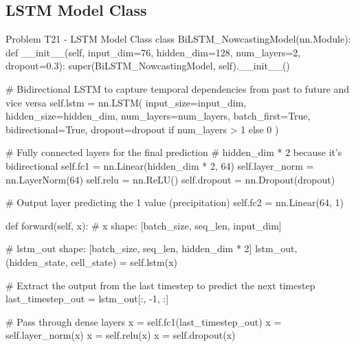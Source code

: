 \documentclass[12pt, a4paper]{article}
\begin{document}
            \subsection{LSTM Model Class}
                \begin{codeblock}{Problem T21 - LSTM Model Class}
                    class BiLSTM_NowcastingModel(nn.Module):
                        def __init__(self, input_dim=76, hidden_dim=128, num_layers=2, dropout=0.3):
                            super(BiLSTM_NowcastingModel, self).__init__()
                            
                            # Bidirectional LSTM to capture temporal dependencies from past to future and vice versa
                            self.lstm = nn.LSTM(
                                input_size=input_dim, 
                                hidden_size=hidden_dim, 
                                num_layers=num_layers, 
                                batch_first=True, 
                                bidirectional=True, 
                                dropout=dropout if num_layers > 1 else 0
                            )
                            
                            # Fully connected layers for the final prediction
                            # hidden_dim * 2 because it's bidirectional
                            self.fc1 = nn.Linear(hidden_dim * 2, 64)
                            self.layer_norm = nn.LayerNorm(64)
                            self.relu = nn.ReLU()
                            self.dropout = nn.Dropout(dropout)
                            
                            # Output layer predicting the 1 value (precipitation)
                            self.fc2 = nn.Linear(64, 1)

                        def forward(self, x):
                            # x shape: [batch_size, seq_len, input_dim]
                            
                            # lstm_out shape: [batch_size, seq_len, hidden_dim * 2]
                            lstm_out, (hidden_state, cell_state) = self.lstm(x)
                            
                            # Extract the output from the last timestep to predict the next timestep
                            last_timestep_out = lstm_out[:, -1, :] 
                            
                            # Pass through dense layers
                            x = self.fc1(last_timestep_out)
                            x = self.layer_norm(x)
                            x = self.relu(x)
                            x = self.dropout(x)
                            

\end{codeblock}
\end{document}
